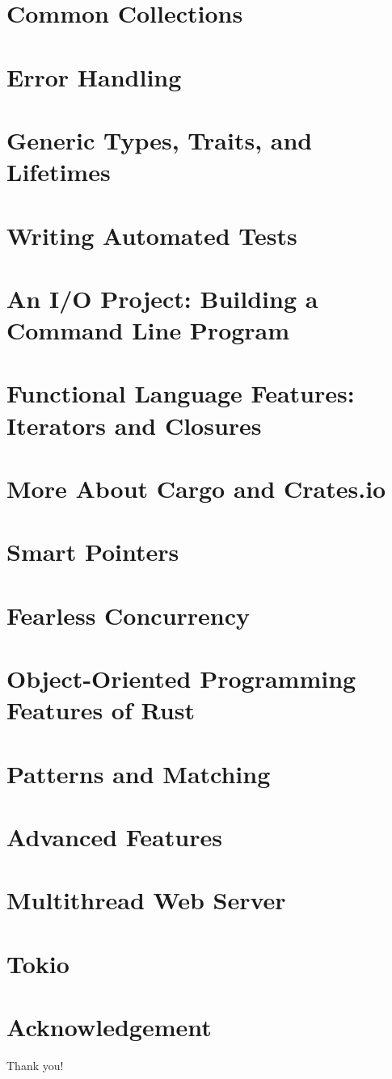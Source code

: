 \documentclass{beamer}
\begin{document}
\section{Common Collections}
\section{Error Handling}
\section{Generic Types, Traits, and Lifetimes}
\section{Writing Automated Tests}
\section{An I/O Project: Building a Command Line Program}
\section{Functional Language Features: Iterators and Closures}
\section{More About Cargo and Crates.io}
\section{Smart Pointers}
\section{Fearless Concurrency}
\section{Object-Oriented Programming Features of Rust}
\section{Patterns and Matching}
\section{Advanced Features}
\section{Multithread Web Server}
\section{Tokio}

\section*{Acknowledgement}
\begin{frame}
	\Huge{\centerline{Thank you!}}
\end{frame}
\end{document}

